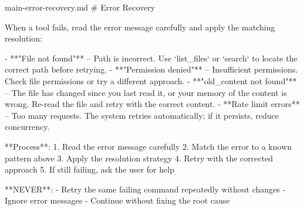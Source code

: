 \begin{prompttemplate}{main-error-recovery.md}
# Error Recovery

When a tool fails, read the error message carefully and apply the matching
resolution:

- **"File not found"** -- Path is incorrect. Use `list_files` or `search`
  to locate the correct path before retrying.
- **"Permission denied"** -- Insufficient permissions. Check file
  permissions or try a different approach.
- **"old_content not found"** -- The file has changed since you last read
  it, or your memory of the content is wrong. Re-read the file and retry
  with the correct content.
- **Rate limit errors** -- Too many requests. The system retries
  automatically; if it persists, reduce concurrency.

**Process**:
1. Read the error message carefully
2. Match the error to a known pattern above
3. Apply the resolution strategy
4. Retry with the corrected approach
5. If still failing, ask the user for help

**NEVER**:
- Retry the same failing command repeatedly without changes
- Ignore error messages
- Continue without fixing the root cause
\end{prompttemplate}

